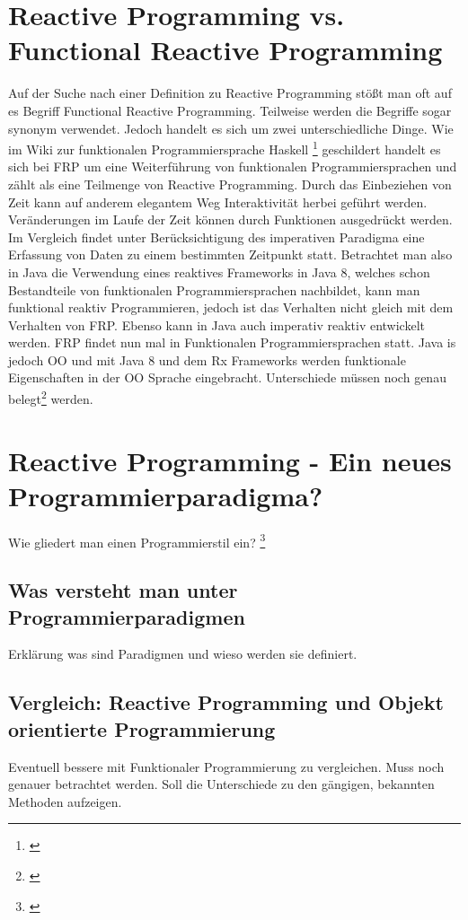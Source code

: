 \section{Reactive Programming vs. Functional Reactive Programming}
Auf der Suche nach einer Definition zu Reactive Programming stößt man oft auf es Begriff Functional Reactive Programming. Teilweise werden die Begriffe sogar synonym verwendet. Jedoch handelt es sich um zwei unterschiedliche Dinge. Wie im Wiki zur funktionalen Programmiersprache Haskell \footnote{\cite{frp.haskell}} geschildert handelt es sich bei FRP um eine Weiterführung von funktionalen Programmiersprachen und zählt als eine Teilmenge von Reactive Programming. Durch das Einbeziehen von Zeit kann auf anderem elegantem Weg Interaktivität herbei geführt werden. Veränderungen im Laufe der Zeit können durch Funktionen ausgedrückt werden. Im Vergleich findet unter Berücksichtigung des imperativen Paradigma eine Erfassung von Daten zu einem bestimmten Zeitpunkt statt. Betrachtet man also in Java die Verwendung eines reaktives Frameworks in Java 8, welches schon Bestandteile von funktionalen Programmiersprachen nachbildet, kann man funktional reaktiv Programmieren, jedoch ist das Verhalten nicht gleich mit dem Verhalten von FRP. Ebenso kann in Java auch imperativ reaktiv entwickelt werden.
FRP findet nun mal in Funktionalen Programmiersprachen statt. Java is jedoch OO und mit Java 8 und dem Rx Frameworks werden funktionale Eigenschaften in der OO Sprache eingebracht. Unterschiede müssen noch genau belegt\footnote{\cite{Lohmuller.2016}} werden.

\section{Reactive Programming - Ein neues Programmierparadigma?}
Wie gliedert man einen Programmierstil ein? \footnote{\cite{Bainomugisha.2013}}
\subsection{Was versteht man unter Programmierparadigmen}
 Erklärung was sind Paradigmen und wieso werden sie definiert.
\subsection{Vergleich: Reactive Programming und Objekt orientierte Programmierung}
Eventuell bessere mit Funktionaler Programmierung zu vergleichen. Muss noch genauer betrachtet werden. Soll die Unterschiede zu den gängigen, bekannten Methoden aufzeigen.
